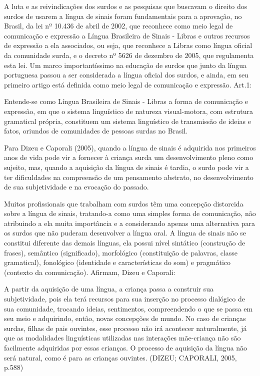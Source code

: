 \documentclass[brasil]{abnt}
\begin{document}
		A luta e as reivindicações dos surdos e as pesquisas que buscavam o direito dos surdos de usarem a língua de sinais foram fundamentais para a aprovação, no Brasil, da lei nº 10.436 de abril de 2002,
		que reconhece como meio legal de comunicação e expressão a Língua Brasileira de Sinais - Libras e outros recursos de expressão a ela associados, ou seja, que reconhece a Libras como língua oficial 
		da comunidade surda, e o decreto nº 5626 de dezembro de 2005, que regulamenta esta lei. Um marco importantíssimo na educação de surdos que junto da língua portuguesa passou a ser considerada a 
		língua oficial dos surdos, e ainda, em seu primeiro artigo está definida como meio legal de comunicação e expressão. Art.1:
			
				\begin{citacao} Entende-se como Língua Brasileira de Sinais - Libras a forma de comunicação e expressão, em que o sistema linguístico de natureza visual-motora, com estrutura gramatical própria, constituem
								um sistema linguístico de transmissão de ideias e fatos, oriundos de comunidades de pessoas surdas no Brasil.
				\end{citacao}
				
		Para Dizeu e Caporali (2005), quando a língua de sinais é adquirida nos primeiros anos de vida pode vir a fornecer à criança surda um desenvolvimento pleno como sujeito, mas, quando a aquisição da 
		língua de sinais é tardia, o surdo pode vir a ter dificuldades na compreensão de um pensamento abstrato, no desenvolvimento de sua subjetividade e na evocação do passado.
			
		Muitos profissionais que trabalham com surdos têm uma concepção distorcida sobre a língua de sinais, tratando-a como uma simples forma de comunicação, não atribuindo a ela muita importância e a 
		considerando apenas uma alternativa para os surdos que não puderam desenvolver a língua oral. A língua de sinais não se constitui diferente das demais línguas, ela possui nível sintático 
		(construção de frases), semântico (significado), morfológico (constituição de palavras, classe gramatical), fonológico (identidade e características do som) e pragmático (contexto da comunicação). 
		Afirmam, Dizeu e Caporali:
			
				\begin{citacao}A partir da aquisição de uma língua, a criança passa a construir sua subjetividade, pois ela terá recursos para sua inserção no processo dialógico de sua comunidade, trocando 
								ideias, sentimentos, compreendendo o que se passa em seu meio e adquirindo, então, novas concepções de mundo. No caso de crianças surdas, filhas de pais ouvintes, esse processo 
								não irá acontecer naturalmente, já que as modalidades linguísticas utilizadas nas interações mãe-criança não são facilmente adquiridas por essas crianças. O processo de 
								aquisição da língua não será natural, como é para as crianças ouvintes. (DIZEU; CAPORALI, 2005, p.588)
				\end{citacao}
			
\end{document}
